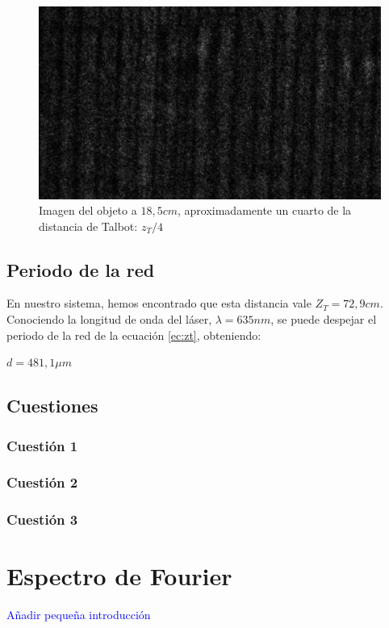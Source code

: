 \documentclass[12pt,a5paper]{article}
\begin{document}
\begin{figure}[h!]
    \centering
    \includegraphics[scale=0.15]{42.2-talbot.png}
    \caption{Imagen del objeto a $18,5 cm$, aproximadamente un cuarto de la distancia de Talbot: $z_T/4$}
    \label{fig:imagen-zt-cuartos}
\end{figure}


\subsection{Periodo de la red}
En nuestro sistema, hemos encontrado que esta distancia vale $Z_T = 72,9 cm$. Conociendo la longitud de onda del láser, $\lambda = 635 nm$, se puede despejar el periodo de la red de la ecuación \ref{ec:zt}, obteniendo:

\begin{center}
    $d = 481,1 \mu m$
\end{center}

\subsection{Cuestiones}
\subsubsection{Cuestión 1}
\subsubsection{Cuestión 2}
\subsubsection{Cuestión 3}





\section{Espectro de Fourier}
\textcolor{blue}{Añadir pequeña introducción}
\end{document}
